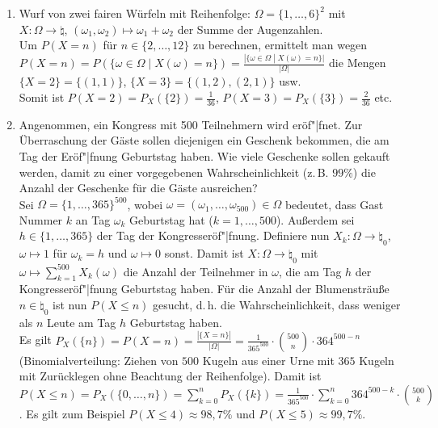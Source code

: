 \linie
\pagebreak

\begin{Bsp}
    \begin{enumerate}
        \item
        Wurf von zwei fairen Würfeln mit Reihenfolge:
        $\Omega = \{1, \dotsc, 6\}^2$ mit\\
        $X\colon \Omega \rightarrow \natural$, $(\omega_1, \omega_2) \mapsto \omega_1 + \omega_2$
        der Summe der Augenzahlen.\\
        Um $P(X = n)$ für $n \in \{2, \dotsc, 12\}$ zu berechnen, ermittelt man wegen\\
        $P(X = n) = P(\{\omega \in \Omega \;|\; X(\omega) = n\}) =
        \frac{|\{\omega \in \Omega \;|\; X(\omega) = n\}|}{|\Omega|}$ die Mengen
        $\{X = 2\} = \{(1, 1)\}$, $\{X = 3\} = \{(1, 2), (2, 1)\}$ usw.\\
        Somit ist $P(X = 2) = P_X(\{2\}) = \frac{1}{36}$,
        $P(X = 3) = P_X(\{3\}) = \frac{2}{36}$ etc.
        
        \item
        Angenommen, ein Kongress mit 500 Teilnehmern wird eröf"|fnet.
        Zur Überraschung der Gäste sollen diejenigen ein Geschenk bekommen, die am Tag der
        Eröf"|fnung Geburtstag haben.
        Wie viele Geschenke sollen gekauft werden, damit zu einer vorgegebenen Wahrscheinlichkeit
        (z.\,B. $99\%$) die Anzahl der Geschenke für die Gäste ausreichen?\\
        Sei $\Omega = \{1, \dotsc, 365\}^{500}$, wobei
        $\omega = (\omega_1, \dotsc, \omega_{500}) \in \Omega$ bedeutet, dass Gast Nummer $k$
        an Tag $\omega_k$ Geburtstag hat ($k = 1, \dotsc, 500$).
        Außerdem sei $h \in \{1, \dotsc, 365\}$ der Tag der Kongresseröf"|fnung.
        Definiere nun $X_k\colon \Omega \rightarrow \natural_0$,
        $\omega \mapsto 1$ für $\omega_k = h$ und $\omega \mapsto 0$ sonst.
        Damit ist $X\colon \Omega \rightarrow \natural_0$ mit
        $\omega \mapsto \sum_{k=1}^{500} X_k(\omega)$ die Anzahl der Teilnehmer in $\omega$,
        die am Tag $h$ der Kongresseröf"|fnung Geburtstag haben.
        Für die Anzahl der Blumensträuße $n \in \natural_0$ ist nun $P(X \le n)$ gesucht,
        d.\,h. die Wahrscheinlichkeit, dass weniger als $n$ Leute am Tag $h$ Geburtstag haben.\\
        Es gilt $P_X(\{n\}) = P(X = n) = \frac{|\{X = n\}|}{|\Omega|} =
        \frac{1}{365^{500}} \cdot \binom{500}{n} \cdot 364^{500-n}$
        (Binomialverteilung: Ziehen von $500$ Kugeln aus einer Urne mit $365$ Kugeln mit
        Zurücklegen ohne Beachtung der Reihenfolge).
        Damit ist $P(X \le n) = P_X(\{0, \dotsc, n\}) = \sum_{k=0}^n P_X(\{k\})
        = \frac{1}{365^{500}} \cdot \sum_{k=0}^n 364^{500-k} \cdot \binom{500}{k}$.
        Es gilt zum Beispiel $P(X \le 4) \approx 98{,}7\%$ und
        $P(X \le 5) \approx 99{,}7\%$.
    \end{enumerate}
\end{Bsp}

